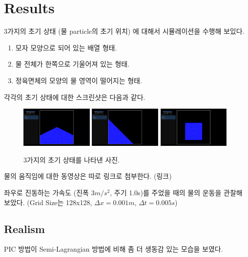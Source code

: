 \documentclass[10pt, A4]{article}
\begin{document}
\section{Results}

3가지의 초기 상태 (물 particle의 초기 위치) 에 대해서 시뮬레이션을 수행해 보있다.

\begin{enumerate}[label=\Alph*.]
  \item 모자 모양으로 되어 있는 배열 형태.
  \item 물 전체가 한쪽으로 기울어져 있는 형태.
  \item 정육면체의 모양의 물 영역이 떨어지는 형태.
\end{enumerate}

각각의 초기 상태에 대한 스크린샷은 다음과 같다.

\begin{figure}[h]
\includegraphics[width=0.32\textwidth]{init_state_1}
\includegraphics[width=0.32\textwidth]{init_state_2}
\includegraphics[width=0.32\textwidth]{init_state_3}
  \caption{3가지의 초기 상태를 나타낸 사진.}
\end{figure}

물의 움직임에 대한 동영상은 따로 링크로 첨부한다. (링크)

좌우로 진동하는 가속도 (진폭 3$m/s^2$, 주기 1.0s)를 주었을 때의 물의 운동을 관찰해 보았다. (Grid Size는 128x128, $\Delta x = 0.001m$, $\Delta t = 0.005s$)

\subsection{Realism}

PIC 방법이 Semi-Lagrangian 방법에 비해 좀 더 생동감 있는 모습을 보였다.
\end{document}
